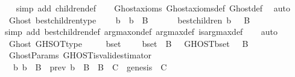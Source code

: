 \begin{isabellebody}
%
\isadelimproof
\ \ %
\endisadelimproof
%
\isatagproof
{}\isamarkupfalse%
\ {\isacharparenleft}simp\ add{\isacharcolon}\ children{\isacharunderscore}def{\isacharparenright}\isanewline
\ \ \isamarkupfalse%
\ Ghost{\isacharunderscore}axioms\ Ghost{\isacharunderscore}axioms{\isacharunderscore}def\ Ghost{\isacharunderscore}def\ \isamarkupfalse%
\ auto%
\endisatagproof
{\isafoldproof}%
%
\isadelimproof
\isanewline
%
\endisadelimproof
\isanewline
{}\isamarkupfalse%
\ {\isacharparenleft}\ Ghost{\isacharparenright}\ best{\isacharunderscore}children{\isacharunderscore}type\ {\isacharcolon}\isanewline
\ \ {\isachardoublequoteopen}{\isasymforall}\ b\ {\isasymsigma}{\isachardot}\ b\ {\isasymin}\ B\ {\isasymand}\ {\isasymsigma}\ {\isasymin}\ {\isasymSigma}\ {\isasymlongrightarrow}\ \ best{\isacharunderscore}children\ {\isacharparenleft}b{\isacharcomma}\ {\isasymsigma}{\isacharparenright}\ {\isasymsubseteq}\ B{\isachardoublequoteclose}\isanewline
%
\isadelimproof
\ \ %
\endisadelimproof
%
\isatagproof
{}\isamarkupfalse%
\ {\isacharparenleft}simp\ add{\isacharcolon}\ best{\isacharunderscore}children{\isacharunderscore}def\ arg{\isacharunderscore}max{\isacharunderscore}on{\isacharunderscore}def\ arg{\isacharunderscore}max{\isacharunderscore}def\ is{\isacharunderscore}arg{\isacharunderscore}max{\isacharunderscore}def{\isacharparenright}\isanewline
\ \ \isamarkupfalse%
\ auto\ \isanewline
\ \ \isamarkupfalse%
%
\endisatagproof
{\isafoldproof}%
%
\isadelimproof
\isanewline
%
\endisadelimproof
\isanewline
{}\isamarkupfalse%
\ {\isacharparenleft}\ Ghost{\isacharparenright}\ GHSOT{\isacharunderscore}type\ {\isacharcolon}\isanewline
\ \ {\isachardoublequoteopen}{\isasymforall}\ {\isasymsigma}\ b{\isacharunderscore}set{\isachardot}\ {\isasymsigma}\ {\isasymin}\ {\isasymSigma}\ {\isasymand}\ b{\isacharunderscore}set\ {\isasymsubseteq}\ B\ {\isasymlongrightarrow}\ \ GHOST{\isacharparenleft}b{\isacharunderscore}set{\isacharcomma}\ {\isasymsigma}{\isacharparenright}\ {\isasymsubseteq}\ B{\isachardoublequoteclose}\isanewline
%
\isadelimproof
\ \ %
\endisadelimproof
%
\isatagproof
{}\isamarkupfalse%
%
\endisatagproof
{\isafoldproof}%
%
\isadelimproof
\isanewline
%
\endisadelimproof
\isanewline
{}\isamarkupfalse%
\ {\isacharparenleft}\ GhostParams{\isacharparenright}\ GHOST{\isacharunderscore}is{\isacharunderscore}valid{\isacharunderscore}estimator\ {\isacharcolon}\ \isanewline
\ \ {\isachardoublequoteopen}{\isacharparenleft}{\isasymforall}\ b{\isachardot}\ b\ {\isasymin}\ B\ {\isasymlongleftrightarrow}\ prev\ b\ {\isasymin}\ B{\isacharparenright}\ {\isasymand}\ B\ {\isacharequal}\ C\ {\isasymand}\ genesis\ {\isasymin}\ C\ \isanewline

\end{isabellebody}
